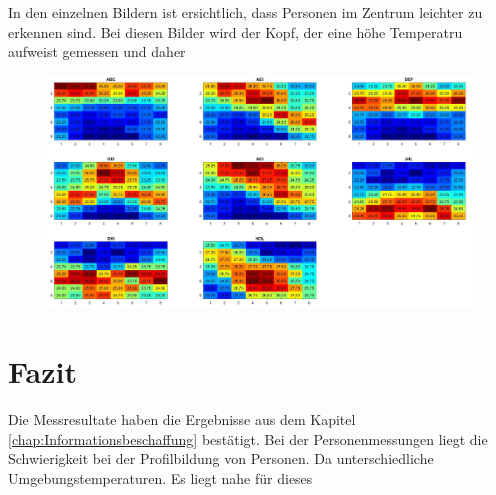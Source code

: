 In den einzelnen Bildern ist ersichtlich, dass Personen im Zentrum leichter zu erkennen sind. Bei diesen Bilder wird der Kopf, der eine höhe Temperatru aufweist gemessen und daher


\begin{figure}
	\centering
	\includegraphics[width=1.0\linewidth]{fig/p3_3x3_allpositons}
	\caption{}
	\label{fig:p33x3allpositons}
\end{figure}





\section{Fazit}
Die Messresultate haben die Ergebnisse aus dem Kapitel \ref{chap:Informationsbeschaffung} bestätigt. Bei der Personenmessungen liegt die Schwierigkeit bei der Profilbildung von Personen. Da unterschiedliche Umgebungstemperaturen.
Es liegt nahe für dieses 
